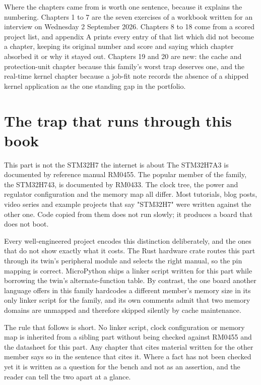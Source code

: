 Where the chapters came from is worth one sentence, because it explains the numbering. Chapters 1 to 7 are the seven exercises of a workbook written for an interview on Wednesday 2 September 2026. Chapters 8 to 18 come from a scored project list, and appendix A prints every entry of that list which did not become a chapter, keeping its original number and score and saying which chapter absorbed it or why it stayed out. Chapters 19 and 20 are new: the cache and protection-unit chapter because this family's worst trap deserves one, and the real-time kernel chapter because a job-fit note records the absence of a shipped kernel application as the one standing gap in the portfolio.

\section*{The trap that runs through this book}

\begin{note}{This part is not the STM32H7 the internet is about}
The STM32H7A3 is documented by reference manual RM0455. The popular member of the family, the STM32H743, is documented by RM0433. The clock tree, the power and regulator configuration and the memory map all differ. Most tutorials, blog posts, video series and example projects that say "STM32H7" were written against the other one. Code copied from them does not run slowly; it produces a board that does not boot.
\end{note}

Every well-engineered project encodes this distinction deliberately, and the ones that do not show exactly what it costs. The Rust hardware crate routes this part through its twin's peripheral module and selects the right manual, so the pin mapping is correct. MicroPython ships a linker script written for this part while borrowing the twin's alternate-function table. By contrast, the one board another language offers in this family hardcodes a different member's memory size in its only linker script for the family, and its own comments admit that two memory domains are unmapped and therefore skipped silently by cache maintenance.

The rule that follows is short. No linker script, clock configuration or memory map is inherited from a sibling part without being checked against RM0455 and the datasheet for this part. Any chapter that cites material written for the other member says so in the sentence that cites it. Where a fact has not been checked yet it is written as a question for the bench and not as an assertion, and the reader can tell the two apart at a glance.

